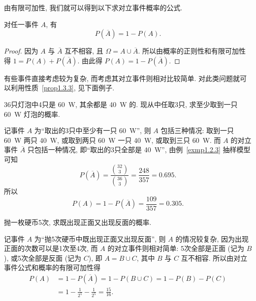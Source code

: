 由有限可加性,
我们就可以得到以下求对立事件概率的公式.

\begin{property}\label{prop1.3.3}
  对任一事件 $A$,
  有
  \begin{equation}
    P (\overline{A}) = 1 - P (A).
    \label{eq1.3.2}
  \end{equation}
\end{property}

\begin{proof}
  因为 $A$ 与 $\overline{A}$ 互不相容,
  且 $\Omega = A \cup \overline{A}$.
  所以由概率的正则性和有限可加性得 $1 = P(A) + P(\overline{A})$.
  由此得 $P(A) = 1 - P(\overline{A})$.
\end{proof}

有些事件直接考虑较为复杂,
而考虑其对立事件则相对比较简单.
对此类问题就可以利用性质~\ref{prop1.3.3},
见下面例子.

\begin{example}
  36只灯泡中4只是 \SI{60}{\watt},
  其余都是 \SI{40}{\watt} 的.
  现从中任取3只,
  求至少取到一只 \SI{60}{\watt} 灯泡的概率.
\end{example}

\begin{solution}
  记事件 $A$ 为“取出的3只中至少有一只 \SI{60}{\watt}”,
  则 $A$ 包括三种情况:
  取到一只 \SI{60}{\watt} 两只 \SI{40}{\watt},
  或取到两只 \SI{60}{\watt} 一只 \SI{40}{\watt},
  或取到三只 \SI{60}{\watt}.
  而 $A$ 的对立事件 $\overline{A}$ 只包括一种情况,
  即“取出的3只全部是 \SI{40}{\watt}”,
  由例~\ref{exmp1.2.3} 抽样模型可知
  \[
    P(\overline{A}) = \frac{\binom{32}{3}}{\binom{36}{3}}
    = \frac{248}{357} = 0.695.
  \]
  所以
  \[
    P(A) = 1 - P(\overline{A}) = \frac{109}{357} = 0.305.
  \]
\end{solution}

\begin{example}
  抛一枚硬币5次,
  求既出现正面又出现反面的概率.
\end{example}

\begin{solution}
  记事件 $A$ 为“抛5次硬币中既出现正面又出现反面”,
  则 $A$ 的情况较复杂,
  因为出现正面的次数可以是1次至4次,
  而 $A$ 的对立事件则相对简单:
  5次全部是正面 (记为 $B$),
  或5次全部是反面 (记为 $C$),
  即 $A = B \cup C$,
  其中 $B$ 与 $C$ 互不相容.
  所以由对立事件公式和概率的有限可加性得
  \begin{align*}
    P (A) &= 1 - P (\overline{A}) = 1 - P (B \cup C) = 1 - P (B) - P (C)\\
    &= 1 - \frac{1}{2^5} - \frac{1}{2^5} = \frac{15}{16}.
  \end{align*}
\end{solution}

